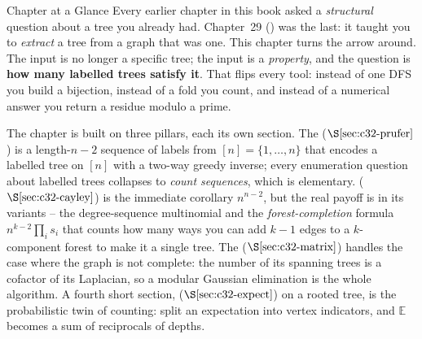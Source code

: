\begin{chaptertheorybox}{Chapter at a Glance}
Every earlier chapter in this book asked a \emph{structural} question about a
tree you already had.  Chapter~29 () was the last: it taught you to
\emph{extract} a tree from a graph that was one.  This chapter turns the arrow
around.  The input is no longer a specific tree; the input is a \emph{property},
and the question is \textbf{how many labelled trees satisfy it}.  That flips
every tool: instead of one DFS you build a bijection, instead of a fold you
count, and instead of a numerical answer you return a residue modulo a prime.

The chapter is built on three pillars, each its own section.  The  (\(\secref{c32-prufer}\)) is a length-\(n-2\) sequence of labels from
\([n]=\{1,\dots,n\}\) that encodes a labelled tree on \([n]\) with a two-way
greedy inverse; every enumeration question about labelled trees collapses to
\emph{count sequences}, which is elementary.  
(\(\secref{c32-cayley}\)) is the immediate corollary \(n^{n-2}\), but the real
payoff is in its variants -- the degree-sequence multinomial and the
\emph{forest-completion} formula \(n^{k-2}\prod_i s_i\) that counts how many
ways you can add \(k-1\) edges to a \(k\)-component forest to make it a single
tree.  The  (\(\secref{c32-matrix}\)) handles the
case where the graph is not complete: the number of its spanning trees is a
cofactor of its Laplacian, so a modular Gaussian elimination is the whole
algorithm.  A fourth short section, 
(\(\secref{c32-expect}\)) on a rooted
tree, is the probabilistic twin of counting: split
an expectation into vertex indicators, and \(\mathbb{E}\) becomes a sum of
reciprocals of depths.


\end{chaptertheorybox}
